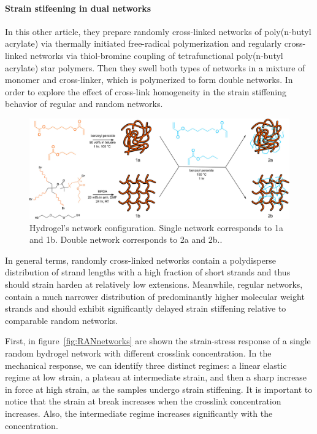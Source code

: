 \paragraph{Strain stifeening in dual networks}
In this other article\citep{kongEffectCrossLinkHomogeneity2024}, they prepare randomly cross-linked networks of poly(n-butyl acrylate) via thermally initiated free-radical polymerization and regularly cross-linked networks via thiol-bromine coupling of tetrafunctional poly(n-butyl acrylate) star polymers. 
Then they swell both types of networks in a mixture of monomer and cross-linker, which is polymerized to form double networks.
In order to explore the effect of cross-link homogeneity in the strain stiffening behavior of regular and random networks.

\begin{figure}[ht!]
    \centering
    \includegraphics[width=\textwidth]{figs/explainMechResponse/RAN-REG-networks.jpeg}
    \caption{Hydrogel's network configuration.
        Single network corresponds to 1a and 1b. 
        Double network corresponds to 2a and 2b.\citep{kongEffectCrossLinkHomogeneity2024}.}\label{fig:RANREGnetworks}
\end{figure}

In general terms, randomly cross-linked networks contain a polydisperse distribution of strand lengths with a high fraction of short strands and thus should strain harden at relatively low extensions. 
Meanwhile, regular networks, contain a much narrower distribution of predominantly higher molecular weight strands and should exhibit significantly delayed strain stiffening relative to comparable random networks.

First, in figure~\ref{fig:RANnetworks} are shown the strain-stress response of a single random hydrogel network with different crosslink concentration.
In the mechanical response, we can identify three distinct regimes: a linear elastic regime at low strain, a plateau at intermediate strain, and then a sharp increase in force at high strain, as the samples undergo strain stiffening.
It is important to notice that the strain at break increases when the crosslink concentration increases.
Also, the intermediate regime increases significantly with the concentration.

